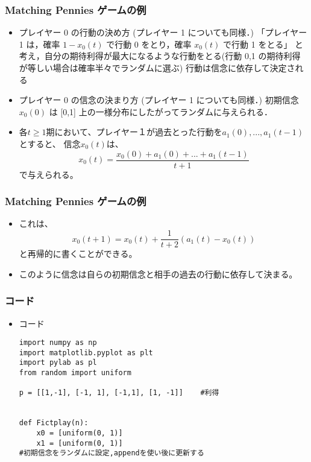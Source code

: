 \documentclass[dvipdfmx,fleqn,handout]{beamer}
\begin{document}
\begin{frame}
\frametitle{Matching Pennies ゲームの例}
\begin{itemize}\setlength{\parskip}{0.5em}
\item
プレイヤー 0 の行動の決め方  (プレイヤー 1 についても同様．)
「プレイヤー 1 は，確率 $1-x_0(t)$ で行動 0 をとり，確率 $x_0(t)$ で行動 1 をとる」 と考え，自分の期待利得が最大になるような行動をとる(行動 0,1 の期待利得が等しい場合は確率半々でランダムに選ぶ)
行動は信念に依存して決定される


\item
プレイヤー 0 の信念の決まり方  (プレイヤー 1 についても同様．)
初期信念 $x_0(0)$ は [0,1] 上の一様分布にしたがってランダムに与えられる．
 \item
 各$t\geq1$期において、プレイヤー１が過去とった行動を$a_1(0),...,a_1(t-1)$とすると、
 信念$x_0(t)$は、
 \[
 x_0(t)
 = \frac{x_0(0)+a_1(0)+...+a_1(t-1)}{t+1} 
 \]
 で与えられる。
 \end{itemize}
\end{frame}


\begin{frame}
\frametitle{Matching Pennies ゲームの例}
\begin{itemize}\setlength{\parskip}{0.5em}
\item
 これは、
 \[
 x_0(t+1)
 = x_0(t) + \frac{1}{t+2} (a_1(t) - x_0(t))
 \]
 と再帰的に書くことができる。 \pause

\item
このように信念は自らの初期信念と相手の過去の行動に依存して決まる。
\end{itemize}
\end{frame}




\begin{frame}[fragile]%
\frametitle{コード}
\begin{itemize}\setlength{\parskip}{0.5em}
\item
コード
\begin{verbatim}
import numpy as np
import matplotlib.pyplot as plt
import pylab as pl
from random import uniform

p = [[1,-1], [-1, 1], [-1,1], [1, -1]]    #利得

        
def Fictplay(n):
    x0 = [uniform(0, 1)] 
    x1 = [uniform(0, 1)]
#初期信念をランダムに設定,appendを使い後に更新する
\end{verbatim}
\end{itemize}
\end{frame}
\end{document}
